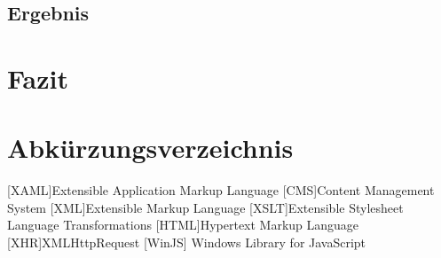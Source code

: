 \documentclass[12pt,a4paper]{scrartcl}
\begin{document}
\subsection{Ergebnis}
\label{subsec:ergebnis}

\newpage
\section{Fazit}
\label{sec:fazit}

\newpage
\section*{Abkürzungsverzeichnis}
\label{sec:abkürzungen}
\begin{acronym}[SEPSEP]
	[XAML]{Extensible Application Markup Language}
	 [CMS]{Content Management System}
	 [XML]{Extensible Markup Language}
	[XSLT]{Extensible Stylesheet Language Transformations}
	[HTML]{Hypertext Markup Language}
	[XHR]{XMLHttpRequest}
	[WinJS] {Windows Library for JavaScript}
\end{acronym}

\newpage
\begin{singlespace}
	
	
\end{singlespace}

\newpage
\listoffigures

\newpage
\lstlistoflistings
\end{document}
